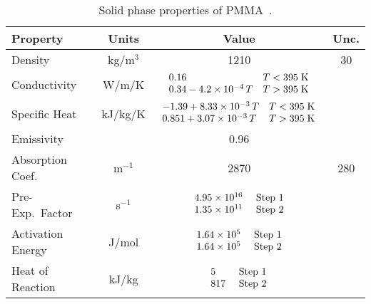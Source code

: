 \begin{table}[!h]
\caption[Solid phase PMMA properties]{Solid phase properties of PMMA~\cite{Fiola:FSJ2021}.}
\begin{center}
\begin{tabular}{|l|c|c|c|}
\hline
Property                    & Units         & Value                                                                                                                                        & Unc.           \\ \hline \hline
Density                     & kg/m$^3$      & 1210                                                                                                                                         & 30             \\ \hline
Conductivity                & W/m/K         & $\begin{array}{ll} 0.16  & T<395 \; \hbox{K} \\  0.34 - 4.2 \times 10^{-4} \, T  & T>395 \; \hbox{K} \end{array}$                            &                \\ \hline
Specific Heat               & kJ/kg/K       & $\begin{array}{ll} -1.39+ 8.33 \times 10^{-3} \, T & T<395 \; \hbox{K} \\ 0.851 + 3.07 \times 10^{-3} \, T & T>395 \; \hbox{K} \end{array}$  &                \\ \hline
Emissivity                  &               & 0.96                                                                                                                                         &                \\ \hline
Absorption Coef.            & m$^{-1}$      & 2870                                                                                                                                         & 280            \\ \hline
Pre-Exp.~Factor             & s$^{-1}$      & $\begin{array}{ll} 4.95 \times 10^{16} & \hbox{ Step 1} \\ 1.35 \times 10^{11} & \hbox{ Step 2} \end{array}$                                 &                \\ \hline
Activation Energy           & J/mol         & $\begin{array}{ll} 1.64 \times 10^{5}  & \hbox{ Step 1} \\ 1.64 \times 10^{5}  & \hbox{ Step 2} \end{array}$                                 &                \\ \hline
Heat of Reaction            & kJ/kg         & $\begin{array}{ll} 5                   & \hbox{ Step 1} \\ 817                 & \hbox{ Step 2} \end{array}$                                 &                \\ \hline
\end{tabular}
\end{center}
\label{NIST_PMMA_Properties}
\end{table}
